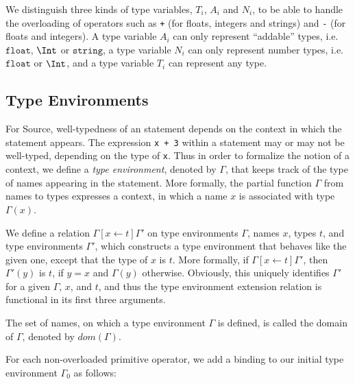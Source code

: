 We distinguish three kinds of type variables, $T_i$, $A_i$ and $N_i$, to be able to handle
the overloading of operators such as \texttt{+} (for floats, integers and strings)
and \texttt{-} (for floats and integers). A type variable $A_i$ can only
represent ``addable'' types, i.e. 
$\texttt{float}$, $\Int$ or $\texttt{string}$, a type variable $N_i$ can
only represent number types, i.e.
$\texttt{float}$ or $\Int$, and
a type variable $T_i$ can represent any type.

\subsection{Type Environments}

For Source, well-typedness of an statement depends on the context in which the
statement appears. The expression \verb#x + 3# within a statement may or may 
not be well-typed, depending on the type of \verb#x#. Thus in order 
to formalize the notion of a context, we define a 
\emph{type environment}, denoted by $\Gamma$, that keeps track
of the type of names appearing in the statement. More
formally,
the partial function $\Gamma$ from names to types expresses a 
context, in which a name $x$ is associated with type $\Gamma(x)$. 

We define a relation $\Gamma[x \leftarrow t]\Gamma'$ on type environments 
$\Gamma$, names $x$, types $t$, and type environments $\Gamma'$,
which constructs a type environment that behaves like the 
given one, except that the type of $x$ is $t$. More formally, 
if $\Gamma[x \leftarrow t]\Gamma'$, then $\Gamma'(y)$ is $t$, 
if $y=x$ and $\Gamma(y)$ 
otherwise. Obviously, this uniquely identifies $\Gamma'$ for
a given $\Gamma$, $x$, and $t$, and thus the type environment extension
relation is functional in its first three arguments.

The set of names, on which a type environment
$\Gamma$ is defined, is called the domain of $\Gamma$, 
denoted by $\textit{dom}(\Gamma)$.


For each non-overloaded primitive operator, we add a binding to our initial
type environment $\Gamma_0$ as follows:

